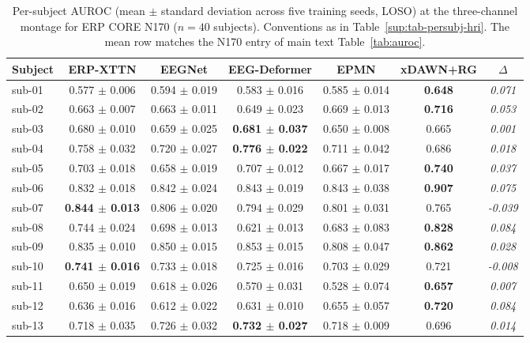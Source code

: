 \begin{table}[t]
\centering
\caption{%
Per-subject AUROC (mean $\pm$ standard deviation across five training seeds, LOSO) at the three-channel montage for ERP CORE N170 ($n = 40$ subjects). Conventions as in Table~\ref{sup:tab-persubj-hri}. The mean row matches the N170 entry of main text Table~\ref{tab:auroc}.%
}
\label{sup:tab-persubj-n170}
\begin{tabular}{lcccccc}
\toprule
Subject & ERP-XTTN & EEGNet & EEG-Deformer & EPMN & xDAWN+RG & $\Delta$ \\
\midrule
sub-01 & 0.577 $\pm$ 0.006 & 0.594 $\pm$ 0.019 & 0.583 $\pm$ 0.016 & 0.585 $\pm$ 0.014 & \textbf{0.648} & \textit{0.071} \\
sub-02 & 0.663 $\pm$ 0.007 & 0.663 $\pm$ 0.011 & 0.649 $\pm$ 0.023 & 0.669 $\pm$ 0.013 & \textbf{0.716} & \textit{0.053} \\
sub-03 & 0.680 $\pm$ 0.010 & 0.659 $\pm$ 0.025 & \textbf{0.681 $\pm$ 0.037} & 0.650 $\pm$ 0.008 & 0.665 & \textit{0.001} \\
sub-04 & 0.758 $\pm$ 0.032 & 0.720 $\pm$ 0.027 & \textbf{0.776 $\pm$ 0.022} & 0.711 $\pm$ 0.042 & 0.686 & \textit{0.018} \\
sub-05 & 0.703 $\pm$ 0.018 & 0.658 $\pm$ 0.019 & 0.707 $\pm$ 0.012 & 0.667 $\pm$ 0.017 & \textbf{0.740} & \textit{0.037} \\
sub-06 & 0.832 $\pm$ 0.018 & 0.842 $\pm$ 0.024 & 0.843 $\pm$ 0.019 & 0.843 $\pm$ 0.038 & \textbf{0.907} & \textit{0.075} \\
sub-07 & \textbf{0.844 $\pm$ 0.013} & 0.806 $\pm$ 0.020 & 0.794 $\pm$ 0.029 & 0.801 $\pm$ 0.031 & 0.765 & \textit{-0.039} \\
sub-08 & 0.744 $\pm$ 0.024 & 0.698 $\pm$ 0.013 & 0.621 $\pm$ 0.013 & 0.683 $\pm$ 0.083 & \textbf{0.828} & \textit{0.084} \\
sub-09 & 0.835 $\pm$ 0.010 & 0.850 $\pm$ 0.015 & 0.853 $\pm$ 0.015 & 0.808 $\pm$ 0.047 & \textbf{0.862} & \textit{0.028} \\
sub-10 & \textbf{0.741 $\pm$ 0.016} & 0.733 $\pm$ 0.018 & 0.725 $\pm$ 0.016 & 0.703 $\pm$ 0.029 & 0.721 & \textit{-0.008} \\
sub-11 & 0.650 $\pm$ 0.019 & 0.618 $\pm$ 0.026 & 0.570 $\pm$ 0.031 & 0.528 $\pm$ 0.074 & \textbf{0.657} & \textit{0.007} \\
sub-12 & 0.636 $\pm$ 0.016 & 0.612 $\pm$ 0.022 & 0.631 $\pm$ 0.010 & 0.655 $\pm$ 0.057 & \textbf{0.720} & \textit{0.084} \\
sub-13 & 0.718 $\pm$ 0.035 & 0.726 $\pm$ 0.032 & \textbf{0.732 $\pm$ 0.027} & 0.718 $\pm$ 0.009 & 0.696 & \textit{0.014} \\

\end{tabular}
\end{table}
